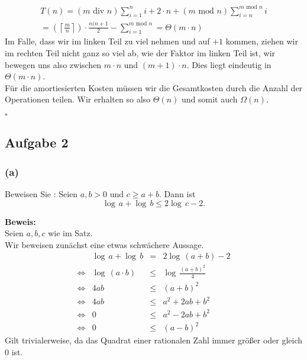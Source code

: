 \documentclass[11pt,a4paper,ngerman]{article}
\begin{document}
   $$\begin{array}{rcl}
      T(n) = (m \text{ div } n) \sum_{i=1}^n i + 2 \cdot n + (m \text{ mod } n) \sum_{i=n}^{m \text{ mod } n} i\\
           = (\left\lceil \frac{m}{n} \right\rceil) \cdot \frac{n(n+1}{2} - \sum_{i=1}^{m \text{ mod } n}
           = \Theta (m \cdot n)
   \end{array}$$
   Im Falle, dass wir im linken Teil zu viel nehmen und auf $+1$ kommen, ziehen wir im rechten Teil nicht ganz so viel ab, wie der Faktor im linken Teil ist,
   wir bewegen uns also zwischen $m \cdot n$ und $(m+1) \cdot n$. Dies liegt eindeutig in $\Theta(m\cdot n)$.\\

   Für die amortiesierten Kosten müssen wir die Gesamtkosten durch die Anzahl der Operationen teilen. Wir erhalten so also $\Theta(n)$ und somit auch $\Omega(n)$.

   \mbox{}\hfill$\square$








\subsection*{Aufgabe 2}

\subsubsection*{(a)}
Beweisen Sie : Seien $a,b > 0$ und $c \geq a+ b$. Dann ist
$$
   \log \, a + \log \, b \leq 2 \log \, c - 2.
$$

\noindent\textbf{Beweis:}\\
Seien $a,b,c$ wie im Satz.\\

Wir beweisen zunächst eine etwas schwächere Aussage.
$$\begin{array}{crcl}
   & \log \, a + \log \,b &=& 2 \log \, (a+b) - 2\\
\Leftrightarrow & \log \, (a\cdot b) &\leq & \log \, \frac{(a+b)^2}{4}\\
\Leftrightarrow & 4ab & \leq & (a+b)^2\\
\Leftrightarrow & 4ab & \leq & a^2 + 2ab + b^2\\
\Leftrightarrow & 0 & \leq & a^2 - 2ab + b^2\\
\Leftrightarrow & 0 & \leq & (a-b)^2
\end{array}$$
Gilt trivialerweise, da das Quadrat einer rationalen Zahl immer größer oder gleich $0$ ist.
\end{document}
